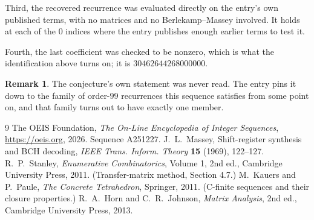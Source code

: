 \documentclass[11pt,a4paper]{article}
\theoremstyle{plain}
\theoremstyle{definition}
\newtheorem{remark}[theorem]{Remark}
\begin{document}
Third, the recovered recurrence was evaluated directly on the entry's own published terms, with
no matrices and no Berlekamp--Massey involved. It holds at each of the $0$ indices where
the entry publishes enough earlier terms to test it.

Fourth, the last coefficient was checked to be nonzero, which is what the identification above
turns on; it is $30462644268000000$.

\begin{remark}
The conjecture's own statement was never read. The entry pins it down to the family of
order-$99$ recurrences this sequence satisfies from some point on, and that family turns
out to have exactly one member.
\end{remark}

\begin{thebibliography}{9}
 The OEIS Foundation, \emph{The On-Line Encyclopedia of Integer
Sequences}, \url{https://oeis.org}, 2026. Sequence A251227.
 J.~L.~Massey, Shift-register synthesis and BCH decoding, \emph{IEEE
Trans. Inform. Theory} \textbf{15} (1969), 122--127.
 R.~P.~Stanley, \emph{Enumerative Combinatorics}, Volume 1, 2nd ed.,
Cambridge University Press, 2011. (Transfer-matrix method, Section 4.7.)
 M.~Kauers and P.~Paule, \emph{The Concrete Tetrahedron}, Springer, 2011.
(C-finite sequences and their closure properties.)
 R.~A.~Horn and C.~R.~Johnson, \emph{Matrix Analysis}, 2nd ed., Cambridge
University Press, 2013.
\end{thebibliography}
\end{document}
